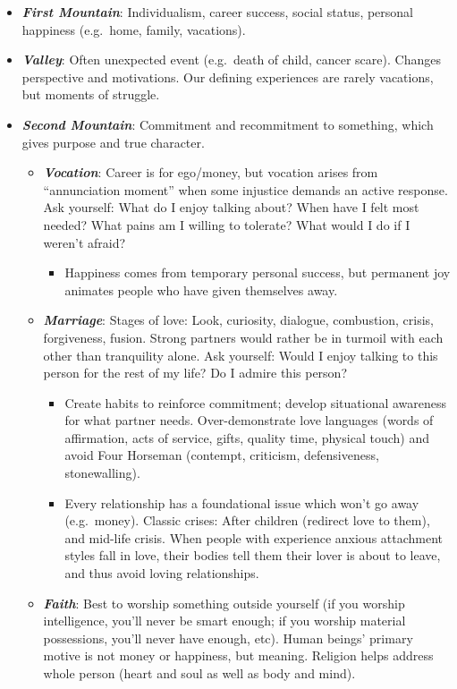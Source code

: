 \documentclass[
]{article}
\providecommand{\tightlist}{%
  \setlength{\itemsep}{0pt}\setlength{\parskip}{0pt}}
\begin{document}
\begin{itemize}
\item
  \textbf{\emph{First Mountain}}: Individualism, career success, social
  status, personal happiness (e.g.~home, family, vacations).
\item
  \textbf{\emph{Valley}}: Often unexpected event (e.g.~death of child,
  cancer scare). Changes perspective and motivations. Our defining
  experiences are rarely vacations, but moments of struggle.
\item
  \textbf{\emph{Second Mountain}}: Commitment and recommitment to
  something, which gives purpose and true character.

  \begin{itemize}
  \item
    \textbf{\emph{Vocation}}: Career is for ego/money, but vocation
    arises from ``annunciation moment'' when some injustice demands an
    active response. Ask yourself: What do I enjoy talking about? When
    have I felt most needed? What pains am I willing to tolerate? What
    would I do if I weren't afraid?

    \begin{itemize}
    \tightlist
    \item
      Happiness comes from temporary personal success, but permanent joy
      animates people who have given themselves away.
    \end{itemize}
  \item
    \textbf{\emph{Marriage}}: Stages of love: Look, curiosity, dialogue,
    combustion, crisis, forgiveness, fusion. Strong partners would
    rather be in turmoil with each other than tranquility alone. Ask
    yourself: Would I enjoy talking to this person for the rest of my
    life? Do I admire this person?

    \begin{itemize}
    \item
      Create habits to reinforce commitment; develop situational
      awareness for what partner needs. Over-demonstrate love languages
      (words of affirmation, acts of service, gifts, quality time,
      physical touch) and avoid Four Horseman (contempt, criticism,
      defensiveness, stonewalling).
    \item
      Every relationship has a foundational issue which won't go away
      (e.g.~money). Classic crises: After children (redirect love to
      them), and mid-life crisis. When people with experience anxious
      attachment styles fall in love, their bodies tell them their lover
      is about to leave, and thus avoid loving relationships.
    \end{itemize}
  \item
    \textbf{\emph{Faith}}: Best to worship something outside yourself
    (if you worship intelligence, you'll never be smart enough; if you
    worship material possessions, you'll never have enough, etc). Human
    beings' primary motive is not money or happiness, but meaning.
    Religion helps address whole person (heart and soul as well as body
    and mind).


\end{itemize}
\end{itemize}
\end{document}
